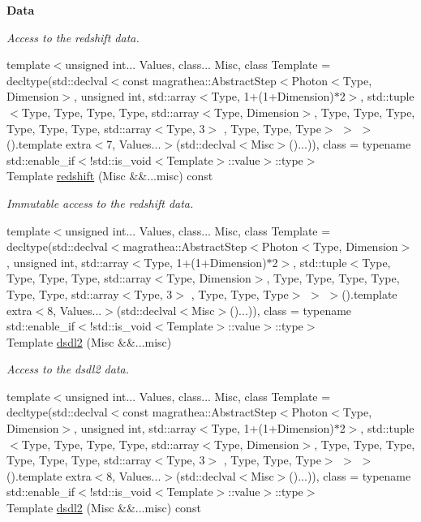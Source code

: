 \begin{Indent}{\bf Data}
\begin{DoxyCompactItemize}
\begin{DoxyCompactList}\small\item\em Access to the redshift data. \end{DoxyCompactList}\item 
{\footnotesize template$<$unsigned int... Values, class... Misc, class Template  = decltype(std\-::declval$<$const magrathea\-::\-Abstract\-Step$<$\-Photon$<$\-Type, Dimension$>$, unsigned int, std\-::array$<$\-Type, 1+(1+\-Dimension)$\ast$2$>$, std\-::tuple$<$\-Type, Type, Type, Type, std\-::array$<$\-Type, Dimension$>$, Type, Type, Type, Type, Type, Type, std\-::array$<$\-Type, 3$>$ , Type, Type, Type$>$ $>$ $>$().\-template extra$<$7, Values...$>$(std\-::declval$<$\-Misc$>$()...)), class  = typename std\-::enable\-\_\-if$<$!std\-::is\-\_\-void$<$\-Template$>$\-::value$>$\-::type$>$ }\\Template \hyperlink{exceptionPhoton_a26a677e15c121d7450f82217108501f3}{redshift} (Misc \&\&...misc) const 
\begin{DoxyCompactList}\small\item\em Immutable access to the redshift data. \end{DoxyCompactList}\item 
{\footnotesize template$<$unsigned int... Values, class... Misc, class Template  = decltype(std\-::declval$<$magrathea\-::\-Abstract\-Step$<$\-Photon$<$\-Type, Dimension$>$, unsigned int, std\-::array$<$\-Type, 1+(1+\-Dimension)$\ast$2$>$, std\-::tuple$<$\-Type, Type, Type, Type, std\-::array$<$\-Type, Dimension$>$, Type, Type, Type, Type, Type, Type, std\-::array$<$\-Type, 3$>$ , Type, Type, Type$>$ $>$ $>$().\-template extra$<$8, Values...$>$(std\-::declval$<$\-Misc$>$()...)), class  = typename std\-::enable\-\_\-if$<$!std\-::is\-\_\-void$<$\-Template$>$\-::value$>$\-::type$>$ }\\Template \hyperlink{exceptionPhoton_aacbb7765d6e351cc0b0294e8cedcf95e}{dsdl2} (Misc \&\&...misc)
\begin{DoxyCompactList}\small\item\em Access to the dsdl2 data. \end{DoxyCompactList}\item 
{\footnotesize template$<$unsigned int... Values, class... Misc, class Template  = decltype(std\-::declval$<$const magrathea\-::\-Abstract\-Step$<$\-Photon$<$\-Type, Dimension$>$, unsigned int, std\-::array$<$\-Type, 1+(1+\-Dimension)$\ast$2$>$, std\-::tuple$<$\-Type, Type, Type, Type, std\-::array$<$\-Type, Dimension$>$, Type, Type, Type, Type, Type, Type, std\-::array$<$\-Type, 3$>$ , Type, Type, Type$>$ $>$ $>$().\-template extra$<$8, Values...$>$(std\-::declval$<$\-Misc$>$()...)), class  = typename std\-::enable\-\_\-if$<$!std\-::is\-\_\-void$<$\-Template$>$\-::value$>$\-::type$>$ }\\Template \hyperlink{exceptionPhoton_a345c120f6e4adf448e59d985cd3626ae}{dsdl2} (Misc \&\&...misc) const 

\end{DoxyCompactItemize}
\end{Indent}
